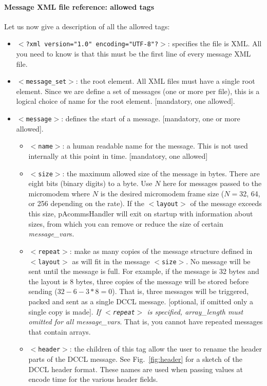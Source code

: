 \documentclass[11pt, letterpaper, oneside]{memoir}
\newcommand{\xmltag}[1]{\texttt{$<$#1$>$}}
\begin{document}
\begin{itemize}
\paragraph{Message XML file reference: allowed tags} Let us now give a description of all the allowed tags:

\begin{itemize}
\item \xmltag{?xml version="1.0" encoding="UTF-8"?}: specifies the file is XML. All you need to know is that this must be the first line of every message XML file.
\item \xmltag{message\_set}: the root element. All XML files must have a single root element. Since we are define a set of messages (one or more per file), this is a logical choice of name for the root element. [mandatory, one allowed].
\item \xmltag{message}: defines the start of a message. [mandatory, one or more allowed].
\begin{itemize}
\item \xmltag{name}: a human readable name for the message. This is not used internally at this point in time. [mandatory, one allowed]
\item \xmltag{size}: the maximum allowed size of the message in bytes. There are eight bits (binary digits) to a byte. Use $N$ here for messages passed to the micromodem where $N$ is the desired micromodem frame size ($N=$32, 64, or 256 depending on the rate). If the \xmltag{layout} of the message exceeds this size, pAcommsHandler will exit on startup with information about sizes, from which you can remove or reduce the size of certain \textit{message\_var}s.
\item \xmltag{repeat}: make as many copies of the message structure defined in \xmltag{layout} as will fit in the message \xmltag{size}. No message will be sent until the message is full. For example, if the message is 32 bytes and the layout is 8 bytes, three copies of the message will be stored before sending ($32-6-3*8 = 0$). That is, three messages will be triggered, packed and sent as a single DCCL message. [optional, if omitted only a single copy is made]. \textit{If \xmltag{repeat} is specified, \textit{array\_length} must omitted for all \textit{message\_vars}}. That is, you cannot have repeated messages that contain arrays.
\item \xmltag{header}: the children of this tag allow the user to rename the header parts of the DCCL message. See Fig.~\ref{fig:header} for a sketch of the DCCL header format. These names are used when passing values at encode time for the various header fields.

\end{itemize}
\end{itemize}
\end{itemize}
\end{document}
